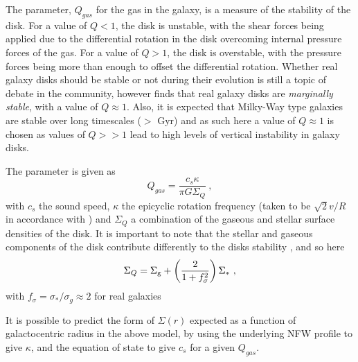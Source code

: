 The \citet{toomre_on_1964} parameter, $Q_{gas}$ for the gas in the galaxy, is a measure of the stability of the disk.
For a value of $Q<1$, the disk is unstable, with the shear forces being applied due to the differential rotation in the disk overcoming internal pressure forces of the gas.
For a value of $Q>1$, the disk is overstable, with the pressure forces being more than enough to offset the differential rotation.
Whether real galaxy disks should be stable or not during their evolution is still a topic of debate in the community, however \citet{SOMEBODY} finds that real galaxy disks are \emph{marginally stable}, with a value of $Q \approx 1$.
Also, it is expected that Milky-Way type galaxies are stable over long timescales ($>$ Gyr) and as such here a value of $Q \approx 1$ is chosen as values of $Q >> 1$ lead to high levels of vertical instability in galaxy disks.

The \citet{toomre1964} parameter is given as
\begin{equation}
    Q_{gas} = \frac{c_s \kappa}{\pi G \Sigma_Q}~,
    \label{eqn:Q}
\end{equation}
with $c_s$ the sound speed, $\kappa$ the epicyclic rotation frequency (taken to be $\sqrt{2} v/R$ in accordance with \citet{livermore_resolved_2015}) and $\Sigma_Q$ a combination of the gaseous and stellar surface densities of the disk.
It is important to note that the stellar and gaseous components of the disk contribute differently to the disks stability \citep{rafikov_local_2001}, and so here
\begin{equation}
    \Sigma_Q = \Sigma_\mathrm{g}  + \left(\frac{2}{1 + f_\sigma^2}\right)\Sigma_*~,
    \label{eqn:sgq}
\end{equation}
with $f_\sigma = \sigma_*/\sigma_g \approx 2$ for real galaxies \citep{korchagin_local_2003}

It is possible to predict the form of $\Sigma(r)$ expected as a function of galactocentric radius in the above model, by using the underlying NFW profile to give $\kappa$, and the equation of state to give $c_s$ for a given $Q_{gas}$.




